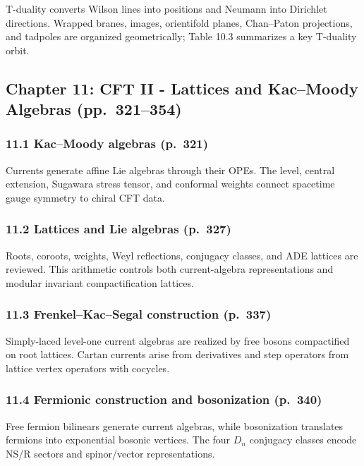 \documentclass[
  10pt,
  a4paper,
  openany]{book}
\begin{document}
T-duality converts Wilson lines into positions and Neumann into
Dirichlet directions. Wrapped branes, images, orientifold planes,
Chan--Paton projections, and tadpoles are organized geometrically; Table
10.3 summarizes a key T-duality orbit.

\subsection{Chapter 11: CFT II - Lattices and Kac--Moody Algebras
(pp.~321--354)}\label{chapter-11-cft-ii---lattices-and-kacmoody-algebras-pp.-321354}

\subsubsection{11.1 Kac--Moody algebras
(p.~321)}\label{kacmoody-algebras-p.-321}

Currents generate affine Lie algebras through their OPEs. The level,
central extension, Sugawara stress tensor, and conformal weights connect
spacetime gauge symmetry to chiral CFT data.

\subsubsection{11.2 Lattices and Lie algebras
(p.~327)}\label{lattices-and-lie-algebras-p.-327}

Roots, coroots, weights, Weyl reflections, conjugacy classes, and ADE
lattices are reviewed. This arithmetic controls both current-algebra
representations and modular invariant compactification lattices.

\subsubsection{11.3 Frenkel--Kac--Segal construction
(p.~337)}\label{frenkelkacsegal-construction-p.-337}

Simply-laced level-one current algebras are realized by free bosons
compactified on root lattices. Cartan currents arise from derivatives
and step operators from lattice vertex operators with cocycles.

\subsubsection{11.4 Fermionic construction and bosonization
(p.~340)}\label{fermionic-construction-and-bosonization-p.-340}

Free fermion bilinears generate current algebras, while bosonization
translates fermions into exponential bosonic vertices. The four \(D_n\)
conjugacy classes encode NS/R sectors and spinor/vector representations.
\end{document}
